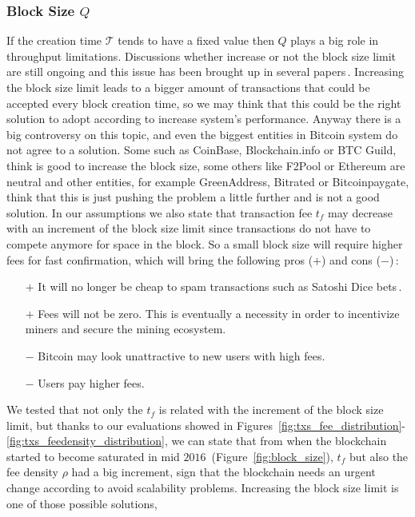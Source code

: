 \documentclass[USenglish]{uit-thesis}
\begin{document}
\subsubsection{Block Size $Q$}
If the creation time $\mathcal{T}$ tends to have a fixed value then
$Q$ plays a big role in throughput limitations. Discussions whether increase
or not the block size limit are still ongoing and this issue has been brought up
in several papers\,\cite{Rizun:2015:blocksizelimit, houy2014EOBTF}. Increasing
the block size limit leads to a bigger amount of transactions that could
be accepted every block creation time, so we may think that
this could be the right solution to adopt
according to increase system's performance.
Anyway there is a big controversy on this topic, and even the
biggest entities in Bitcoin system do not agree to a solution.
Some such as CoinBase, Blockchain.info or BTC Guild, think is
good to increase the block size, some others like F2Pool or Ethereum
are neutral and other entities, for example GreenAddress, Bitrated or
Bitcoinpaygate, think that this is just pushing the problem a little
further and is not a good solution.
In our assumptions we also state that transaction fee
$t_f$ may decrease with an increment of the block size
limit since transactions do not have to compete anymore for
space in the block. So a small block size will require higher
fees for fast confirmation, which will bring the
following pros ($+$) and cons ($-$)\,\cite{blocksizecontroversy}:
\begin{itemize}
	\item [$+$] It will no longer be cheap to spam transactions such as Satoshi Dice bets\,\cite{satoshidice}.
	\item [$+$] Fees will not be zero. This is eventually a necessity in order to incentivize miners and secure the mining ecosystem.
	\item [$-$] Bitcoin may look unattractive to new users with high fees.
	\item [$-$] Users pay higher fees.
\end{itemize}
We tested that not only the $t_f$ is related
with the increment of the block
size limit, but thanks to our evaluations showed in
Figures~\ref{fig:txs_fee_distribution}-\ref{fig:txs_feedensity_distribution},
we can state that from when the blockchain started
to become saturated in mid $2016$~(Figure~\ref{fig:block_size}),
$t_f$ but also the fee density $\rho$ had a big increment, sign
that the blockchain needs an urgent change according to
avoid scalability problems.
Increasing the block size limit is one of those possible solutions,
\end{document}

